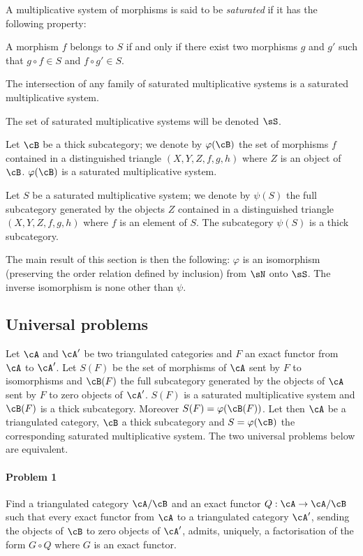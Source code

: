 A multiplicative system of morphisms is said to be \emph{saturated} if it has
the following property:

A morphism $f$ belongs to $S$ if and only if there exist two
morphisms $g$ and $g'$ such that $g\circ f\in S$ and $f\circ g'\in S$.

The intersection of any family of saturated multiplicative systems is
a saturated multiplicative system.

The set of saturated multiplicative systems will be denoted $\sS$.

Let $\cB$ be a thick subcategory; we denote by $\varphi(\cB)$
the set of morphisms $f$ contained in a distinguished triangle
$(X,Y,Z,f,g,h)$ where $Z$ is an object of $\cB$. $\varphi(\cB)$ is a
saturated multiplicative system.

Let $S$ be a saturated multiplicative system; we denote by $\psi(S)$ the
full subcategory generated by the objects $Z$ contained in a
distinguished triangle $(X,Y,Z,f,g,h)$ where $f$ is an element of $S$. The
subcategory $\psi(S)$ is a thick subcategory.

The main result of this section is then the following: $\varphi$ is an
isomorphism (preserving the order relation defined by inclusion) from
$\sN$ onto $\sS$. The inverse isomorphism is none other than $\psi$. 










\subsection{Universal problems}\label{VIII:2-2}

Let $\cA$ and $\cA'$ be two triangulated categories and $F$ an exact
functor from $\cA$ to $\cA'$. Let $S(F)$ be the set of morphisms of $\cA$
sent by $F$ to isomorphisms and $\cB(F)$ the full subcategory
generated by the objects of $\cA$ sent by $F$ to
zero objects of $\cA'$. $S(F)$ is a saturated multiplicative system and
$\cB(F)$ is a thick subcategory. Moreover $S(F) = \varphi(\cB(F))$.
Let then $\cA$ be a triangulated category, $\cB$ a thick subcategory
and $S=\varphi(\cB)$ the corresponding saturated multiplicative system.
The two universal problems below are equivalent.


\paragraph{Problem 1}
\hypertarget{VIII:prob1}{}
Find a triangulated category $\cA/\cB$ and an exact functor
$Q:\cA\to \cA/\cB$ such that every exact functor from $\cA$ to a
triangulated category $\cA'$, sending the objects of $\cB$ to zero objects of
$\cA'$, admits, uniquely, a factorisation of the form $G\circ Q$
where $G$ is an exact functor. 


